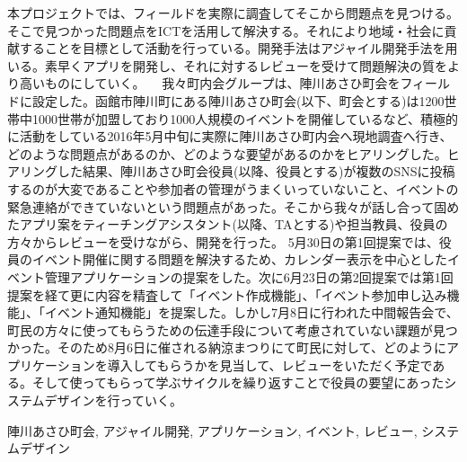 \begin{jabstract}
本プロジェクトでは、フィールドを実際に調査してそこから問題点を見つける。そこで見つかった問題点をICTを活用して解決する。それにより地域・社会に貢献することを目標として活動を行っている。開発手法はアジャイル開発手法を用いる。素早くアプリを開発し、それに対するレビューを受けて問題解決の質をより高いものにしていく。
　我々町内会グループは、陣川あさひ町会をフィールドに設定した。函館市陣川町にある陣川あさひ町会(以下、町会とする)は1200世帯中1000世帯が加盟しており1000人規模のイベントを開催しているなど、積極的に活動をしている2016年5月中旬に実際に陣川あさひ町内会へ現地調査へ行き、どのような問題点があるのか、どのような要望があるのかをヒアリングした。ヒアリングした結果、陣川あさひ町会役員(以降、役員とする)が複数のSNSに投稿するのが大変であることや参加者の管理がうまくいっていないこと、イベントの緊急連絡ができていないという問題点があった。そこから我々が話し合って固めたアプリ案をティーチングアシスタント(以降、TAとする)や担当教員、役員の方々からレビューを受けながら、開発を行った。
5月30日の第1回提案では、役員のイベント開催に関する問題を解決するため、カレンダー表示を中心としたイベント管理アプリケーションの提案をした。次に6月23日の第2回提案では第1回提案を経て更に内容を精査して「イベント作成機能」、「イベント参加申し込み機能」、「イベント通知機能」を提案した。しかし7月8日に行われた中間報告会で、町民の方々に使ってもらうための伝達手段について考慮されていない課題が見つかった。そのため8月6日に催される納涼まつりにて町民に対して、どのようにアプリケーションを導入してもらうかを見当して、レビューをいただく予定である。そして使ってもらって学ぶサイクルを繰り返すことで役員の要望にあったシステムデザインを行っていく。

\begin{jkeyword}
陣川あさひ町会, アジャイル開発, アプリケーション, イベント, レビュー, システムデザイン
\end{jkeyword}
\end{jabstract}
​
